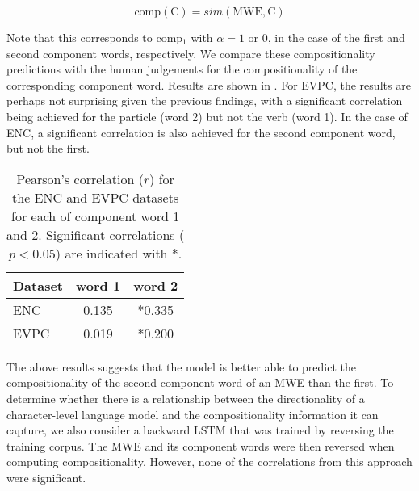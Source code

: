 \documentclass[11pt]{article}
\newcommand{\compone}{comp$_1$\xspace}
\begin{document}
\begin{equation}
\mathrm{comp}(\mathrm{C})=
sim(\mathrm{MWE},\mathrm{C})
\label{eq:compcomponent}
\end{equation}

\noindent
Note that this corresponds to \compone with $\alpha=1$ or $0$, in the
case of the first and second component words, respectively. We compare
these compositionality predictions with the human judgements for the
compositionality of the corresponding component word. Results are
shown in . For EVPC, the results are perhaps
not surprising given the previous findings, with a significant
correlation being achieved for the particle (word 2) but not the verb
(word 1). In the case of ENC, a significant correlation is also
achieved for the second component word, but not the first.


\begin{table}
\begin{center}
\begin{tabular}{lcc}
Dataset & word 1 & word 2\\ 
\hline 
ENC & 0.135 & *0.335 \\ 
EVPC & 0.019 & *0.200 \\
\end{tabular}
\caption{Pearson's correlation ($r$) for the ENC and EVPC datasets for
  each of component word 1 and 2. Significant correlations ($p<0.05$)
  are indicated with *.\label{tab:results:component}}
\end{center}
\end{table}


The above results suggests that the model is better able to predict
the compositionality of the second component word of an MWE than the
first. To determine whether there is a relationship between the
directionality of a character-level language model and the
compositionality information it can capture, we also consider a
backward LSTM that was trained by reversing the training corpus. The
MWE and its component words were then reversed when computing
compositionality. However, none of the correlations from this approach
were significant.
\end{document}
